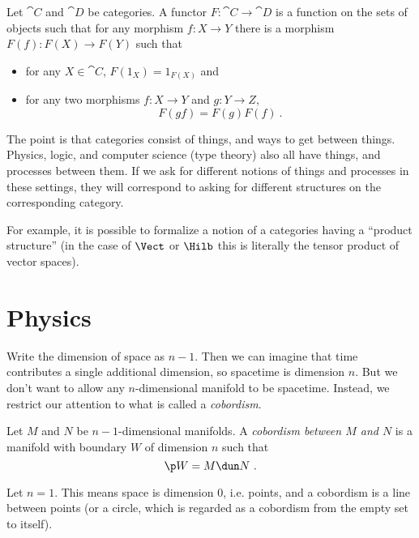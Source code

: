 \documentclass[11pt]{amsart}
\begin{document}
\begin{defn}
Let $\cat{C}$ and $\cat{D}$ be categories.
A functor $F : \cat{C} \to \cat{D}$ is a function on the sets of objects such that
for any morphism $f : X\to Y$ there is a 
morphism $F\left(f\right) : F\left(X\right) \to F\left(Y\right)$ such that
\begin{itemize}
\item for any $X\in \cat{C}$, $F\left(1_X\right) = 1_{F\left(X\right)}$ and
\item for any two morphisms $f : X\to Y$ and $g : Y\to Z$, 
\begin{equation}
F\left(gf\right) = F\left(g\right) F\left(f\right) \ .
\end{equation}
\end{itemize}
\end{defn}

The point is that categories consist of things, and ways to get between things. Physics,
logic, and computer science (type theory) also all have things, and processes between them. 
If we ask for different notions of things and processes in these settings, they will
correspond to asking for different structures on the corresponding category. 

For example, it is possible to formalize a notion of a categories having a ``product
structure'' (in the case of $\Vect$ or $\Hilb$ this is literally the tensor product of
vector spaces).

\section{Physics}

Write the dimension of space as $n-1$.
Then we can imagine that time contributes a single additional dimension, so spacetime is
dimension $n$. But we don't want to allow any $n$-dimensional manifold to be spacetime.
Instead, we restrict our attention to what is called a \emph{cobordism}. 

\begin{defn}
Let $M$ and $N$ be $n-1$-dimensional manifolds.
A \emph{cobordism between $M$ and $N$} is a manifold with boundary $W$ of dimension $n$ 
such that 
\begin{equation}
\p W = M\dun N
\ .
\end{equation}
\end{defn}

\begin{exm}
Let $n = 1$. This means space is dimension $0$, i.e. points, and a cobordism is a line
between points (or a circle, which is regarded as a cobordism from the empty set to
itself).
\end{exm}
\end{document}
